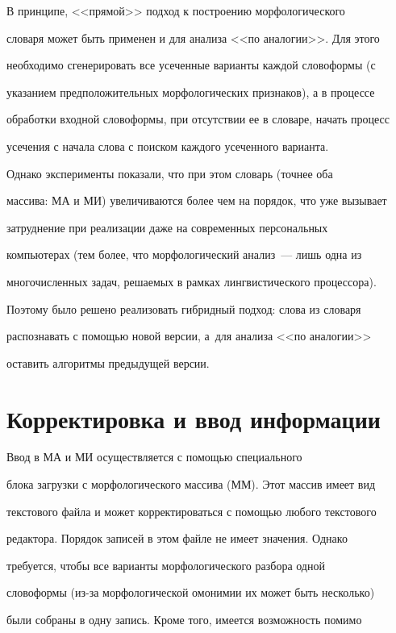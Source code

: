     В принципе, <<прямой>> подход к построению морфологического

словаря может быть применен и для анализа <<по аналогии>>. Для этого

необходимо сгенерировать все усеченные варианты каждой словоформы (с

указанием предположительных морфологических признаков), а в процессе

обработки входной словоформы, при отсутствии ее в словаре, начать процесс

усечения с начала слова с поиском каждого усеченного варианта.



    Однако эксперименты показали, что при этом словарь (точнее оба

массива: МА и МИ) увеличиваются более чем на порядок, что уже вызывает

затруднение при реализации даже на современных персональных

компьютерах (тем более, что морфологический анализ~--- лишь одна из

многочисленных задач, решаемых в рамках лингвистического процессора).

Поэтому было решено реализовать гибридный подход: слова из словаря

распознавать с помощью новой версии, а~для анализа <<по аналогии>>

оставить алгоритмы предыдущей версии.



\section{Корректировка и ввод информации}



    Ввод в МА и МИ осуществляется с помощью специального

блока загрузки с морфологического массива (ММ). Этот массив имеет вид

текстового файла и может корректироваться с помощью любого текстового

редактора. Порядок записей в этом файле не имеет значения. Однако

требуется, чтобы все варианты морфологического разбора одной

словоформы (из-за морфологической омонимии их может быть несколько)

были собраны в одну запись. Кроме того, имеется возможность помимо

